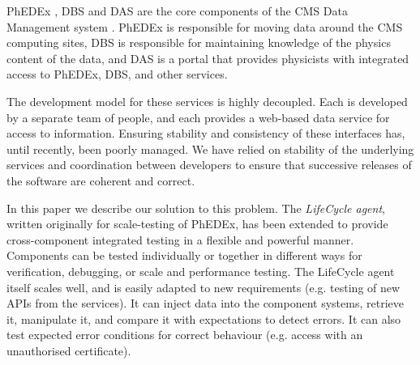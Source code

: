 PhEDEx \cite{PhEDEx}, DBS \cite{DBS} and DAS \cite{DAS} are the core components of the CMS Data 
Management system \cite{CMSDMS}. PhEDEx is responsible for moving data around the CMS computing 
sites, DBS is responsible for maintaining knowledge of the physics content of the data, and DAS is 
a portal that provides physicists with integrated access to PhEDEx, DBS, and other services.

The development model for these services is highly decoupled. Each is developed by a separate team 
of people, and each provides a web-based data service for access to information. Ensuring 
stability and consistency of these interfaces has, until recently, been poorly managed. We have 
relied on stability of the underlying services and coordination between developers to ensure that 
successive releases of the software are coherent and correct.

In this paper we describe our solution to this problem. The {\it LifeCycle agent}, written 
originally for scale-testing of PhEDEx, has been extended to provide cross-component integrated 
testing in a flexible and powerful manner. Components can be tested individually or together in 
different ways for verification, debugging, or scale and performance testing. The LifeCycle agent 
itself scales well, and is easily adapted to new requirements (e.g. testing of new APIs from the 
services). It can inject data into the component systems, retrieve it, manipulate it, and compare 
it with expectations to detect errors. It can also test expected error conditions for correct 
behaviour (e.g. access with an unauthorised certificate).
